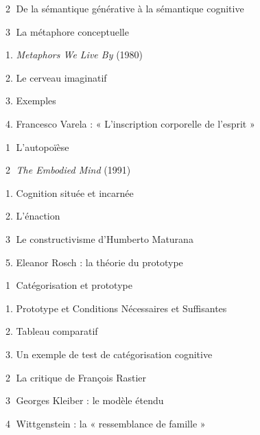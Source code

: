 \begin{keybox}
\hspace*{2em}\textcircled{\scriptsize 2} De la sémantique générative à la sémantique cognitive\par
\hspace*{2em}\textcircled{\scriptsize 3} La métaphore conceptuelle\par
\hspace*{3em}1. \emph{Metaphors We Live By} (1980)\par
\hspace*{3em}2. Le cerveau imaginatif\par
\hspace*{3em}3. Exemples\par
\hspace*{1em}4. Francesco Varela : « L’inscription corporelle de l’esprit »\par
\hspace*{2em}\textcircled{\scriptsize 1} L’autopoïèse\par
\hspace*{2em}\textcircled{\scriptsize 2} \emph{The Embodied Mind} (1991)\par
\hspace*{3em}1. Cognition située et incarnée\par
\hspace*{3em}2. L’énaction\par
\hspace*{2em}\textcircled{\scriptsize 3} Le constructivisme d’Humberto Maturana\par
\hspace*{1em}5. Eleanor Rosch : la théorie du prototype\par
\hspace*{2em}\textcircled{\scriptsize 1} Catégorisation et prototype\par
\hspace*{3em}1. Prototype et Conditions Nécessaires et Suffisantes\par
\hspace*{3em}2. Tableau comparatif\par
\hspace*{3em}3. Un exemple de test de catégorisation cognitive\par
\hspace*{2em}\textcircled{\scriptsize 2} La critique de François Rastier\par
\hspace*{2em}\textcircled{\scriptsize 3} Georges Kleiber : le modèle étendu\par
\hspace*{2em}\textcircled{\scriptsize 4} Wittgenstein : la « ressemblance de famille »\par

\end{keybox}
